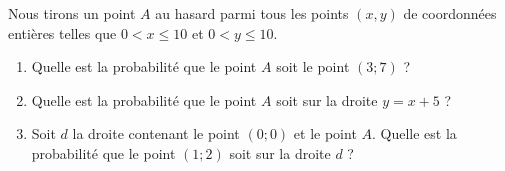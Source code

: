 
\begin{exercice}\label{exosmath-0279}

    Nous tirons un point \( A\) au hasard parmi tous les points \( (x,y)\) de coordonnées entières telles que \( 0< x\leq 10\) et \( 0< y\leq 10\).
    \begin{enumerate}
        \item
            Quelle est la probabilité que le point \( A\) soit le point \( (3;7)\) ?
        \item
            Quelle est la probabilité que le point \( A\) soit sur la droite \( y=x+5\) ?
        \item
            Soit \( d\) la droite contenant le point \( (0;0)\) et le point \( A\). Quelle est la probabilité que le point \( (1;2)\) soit sur la droite \( d\) ?
    \end{enumerate}

\end{exercice}
